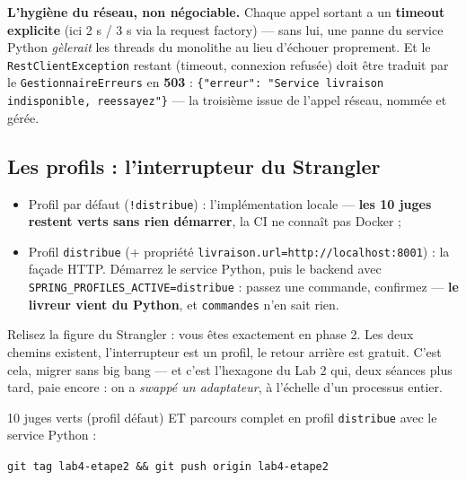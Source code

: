 \documentclass[a4paper,11pt]{article}
\begin{document}
\begin{warningbox}
\textbf{L'hygiène du réseau, non négociable.} Chaque appel sortant a un
\textbf{timeout explicite} (ici 2 s / 3 s via la request factory) --- sans
lui, une panne du service Python \emph{gèlerait} les threads du monolithe
au lieu d'échouer proprement. Et le \texttt{RestClientException} restant
(timeout, connexion refusée) doit être traduit par le
\texttt{GestionnaireErreurs} en \textbf{503} :
\texttt{\{"erreur": "Service livraison indisponible, reessayez"\}} ---
la troisième issue de l'appel réseau, nommée et gérée.
\end{warningbox}

\subsection{Les profils : l'interrupteur du Strangler}

\begin{itemize}[nosep]
  \item Profil par défaut (\texttt{!distribue}) : l'implémentation locale
        --- \textbf{les 10 juges restent verts sans rien démarrer}, la CI
        ne connaît pas Docker ;
  \item Profil \texttt{distribue} (+ propriété
        \texttt{livraison.url=http://localhost:8001}) : la façade HTTP.
        Démarrez le service Python, puis le backend avec
        \texttt{SPRING\_PROFILES\_ACTIVE=distribue} : passez une commande,
        confirmez --- \textbf{le livreur vient du Python}, et
        \texttt{commandes} n'en sait rien.
\end{itemize}

\begin{pointcle}
Relisez la figure du Strangler : vous êtes exactement en phase 2. Les deux
chemins existent, l'interrupteur est un profil, le retour arrière est
gratuit. C'est cela, migrer sans big bang --- et c'est l'hexagone du Lab 2
qui, deux séances plus tard, paie encore : on a \emph{swappé un
adaptateur}, à l'échelle d'un processus entier.
\end{pointcle}

\begin{tagbox}
10 juges verts (profil défaut) ET parcours complet en profil
\texttt{distribue} avec le service Python :
\begin{center}
\texttt{git tag lab4-etape2 \&\& git push origin lab4-etape2}
\end{center}
\end{tagbox}
\end{document}
